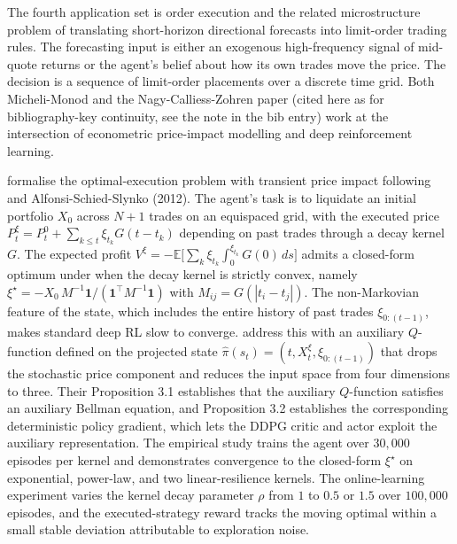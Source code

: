 The fourth application set is order execution and the related microstructure
problem of translating short-horizon directional forecasts into limit-order
trading rules. The forecasting input is either an exogenous high-frequency
signal of mid-quote returns or the agent's belief about how its own trades
move the price. The decision is a sequence of limit-order placements over a
discrete time grid. Both Micheli-Monod and the Nagy-Calliess-Zohren paper
(cited here as \citealp{Briola2023} for bibliography-key continuity, see the
note in the bib entry) work at the intersection of econometric price-impact
modelling and deep reinforcement learning.

\citet{MicheliMonod2024} formalise the optimal-execution problem with
transient price impact following \citet{Obizhaeva2013} and Alfonsi-Schied-Slynko
(2012). The agent's task is to liquidate an initial portfolio $X_0$ across
$N + 1$ trades on an equispaced grid, with the executed price
$P^\xi_t = P^0_t + \sum_{k \le t} \xi_{t_k} G(t - t_k)$ depending on past
trades through a decay kernel $G$. The expected profit
$V^\xi = -\mathbb E\bigl[\sum_k \xi_{t_k} \int_0^{\xi_{t_k}} G(0)\, ds\bigr]$
admits a closed-form optimum under \citet{Alfonsi2012} when the decay kernel
is strictly convex, namely
$\xi^\star = - X_0\, M^{-1} \mathbf 1 / (\mathbf 1^\top M^{-1} \mathbf 1)$
with $M_{ij} = G(|t_i - t_j|)$. The non-Markovian feature of the state, which
includes the entire history of past trades $\xi_{0:(t-1)}$, makes standard
deep RL slow to converge. \citet{MicheliMonod2024} address this with an
auxiliary $Q$-function defined on the projected state
$\hat\pi(s_t) = (t, X^\xi_t, \xi_{0:(t-1)})$ that drops the stochastic price
component and reduces the input space from four dimensions to three. Their
Proposition 3.1 establishes that the auxiliary $Q$-function satisfies an
auxiliary Bellman equation, and Proposition 3.2 establishes the corresponding
deterministic policy gradient, which lets the DDPG critic and actor exploit
the auxiliary representation. The empirical study trains the agent over
$30{,}000$ episodes per kernel and demonstrates convergence to the closed-form
$\xi^\star$ on exponential, power-law, and two linear-resilience kernels. The
online-learning experiment varies the kernel decay parameter $\rho$ from $1$
to $0.5$ or $1.5$ over $100{,}000$ episodes, and the executed-strategy reward
tracks the moving optimal within a small stable deviation attributable to
exploration noise.

